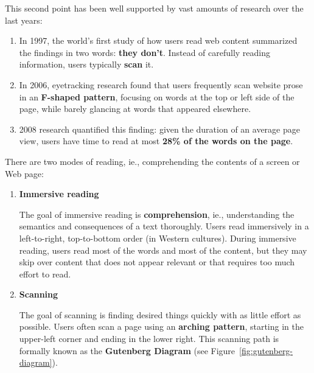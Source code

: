 This second point has been well supported by vast amounts of research over the last years:
\begin{enumerate}
	\item In 1997, the world's first study of how users read web content summarized the findings in two words: \textbf{they don't}. Instead of carefully reading information, users typically \textbf{scan} it.
	\item In 2006, eyetracking research found that users frequently scan website prose in an \textbf{F-shaped pattern}, focusing on words at the top or left side of the page, while barely glancing at words that appeared elsewhere.
	\item 2008 research quantified this finding: given the duration of an average page view, users have time to read at most \textbf{28\% of the words on the page}.
\end{enumerate}



%

There are two modes of reading, ie., comprehending the contents of a screen or Web page:
\begin{enumerate}
	\item \textbf{Immersive reading} \par The goal of immersive reading is \textbf{comprehension}, ie., understanding the semantics and consequences of a text thoroughly.
	Users read immersively in a left-to-right, top-to-bottom order (in Western cultures).
	During immersive reading, users read most of the words and most of the content, but they may skip over content that does not appear relevant or that requires too much effort to read.
	
	\item \textbf{Scanning} \par The goal of scanning is finding desired things quickly with as little effort as possible.
	Users often scan a page using an \textbf{arching pattern}, starting in the upper-left corner and ending in the lower right.
	This scanning path is formally known as the \textbf{Gutenberg Diagram} (see Figure~\ref{fig:gutenberg-diagram}).
	
\end{enumerate}

